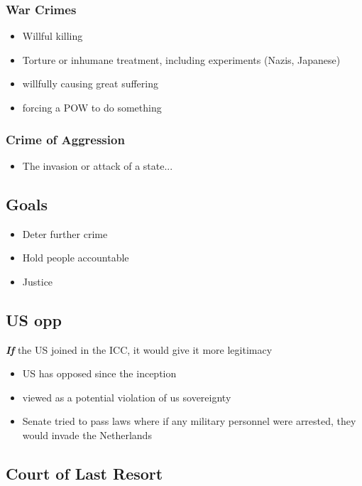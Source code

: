 \documentclass{article}
\begin{document}
\subsubsection{War Crimes}
\begin{itemize}
    \item Willful killing
    \item Torture or inhumane treatment, including experiments (Nazis, Japanese)
    \item willfully causing great suffering
    \item forcing a POW to do something
\end{itemize}

\subsubsection{Crime of Aggression}
\begin{itemize}
    \item The invasion or attack of a state... %
\end{itemize}

\subsection{Goals}
\begin{itemize}
    \item Deter further crime
    \item Hold people accountable
    \item Justice
\end{itemize}

\subsection{US opp}

\textbf{\textit{If}} the US joined in the ICC, it would give it more legitimacy

\begin{itemize}
    \item US has opposed since the inception
    \item viewed as a potential violation of us sovereignty 
    \item Senate tried to pass laws where if any military personnel were arrested, they would invade the Netherlands 
\end{itemize}

\subsection{Court of Last Resort}
\end{document}
